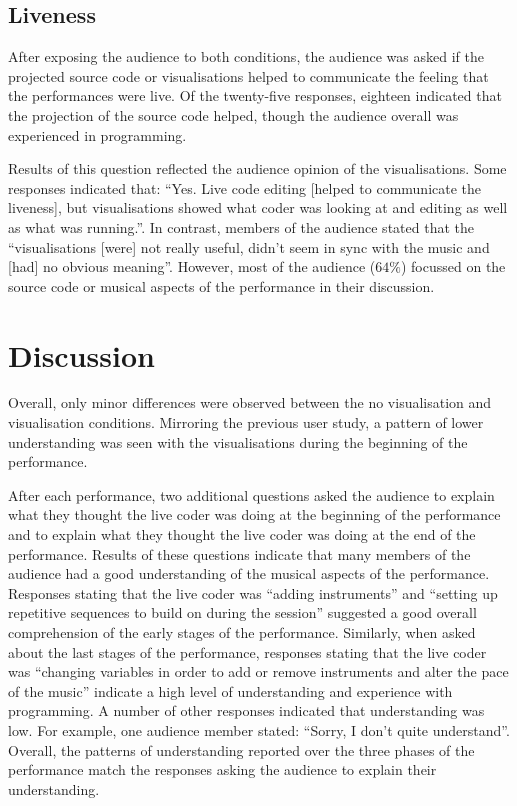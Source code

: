 \subsection{Liveness}

After exposing the audience to both conditions, the audience was asked if the projected source code or visualisations helped to communicate the feeling that the performances were live. Of the twenty-five responses, eighteen indicated that the projection of the source code helped, though the audience overall was experienced in programming. 

Results of this question reflected the audience opinion of the visualisations. Some responses indicated that: ``Yes. Live code editing [helped to communicate the liveness], but visualisations showed what coder was looking at and editing as well as what was running.''. In contrast, members of the audience stated that the ``visualisations [were] not really useful, didn't seem in sync with the music and [had] no obvious meaning''. However, most of the audience ($64\%$) focussed on the source code or musical aspects of the performance in their discussion.

\section{Discussion}

Overall, only minor differences were observed between the no visualisation and visualisation conditions. Mirroring the previous user study, a pattern of lower understanding was seen with the visualisations during the beginning of the performance. 

\more

After each performance, two additional questions asked the audience to explain what they thought the live coder was doing at the beginning of the performance and to explain what they thought the live coder was doing at the end of the performance. Results of these questions indicate that many members of the audience had a good understanding of the musical aspects of the performance. Responses stating that the live coder was ``adding instruments'' and ``setting up repetitive sequences to build on during the session'' suggested a good overall comprehension of the early stages of the performance. Similarly, when asked about the last stages of the performance, responses stating that the live coder was ``changing variables in order to add or remove instruments and alter the pace of the music'' indicate a high level of understanding and experience with programming. A number of other responses indicated that understanding was low. For example, one audience member stated: ``Sorry, I don't quite understand''. Overall, the patterns of understanding reported over the three phases of the performance match the responses asking the audience to explain their understanding.


